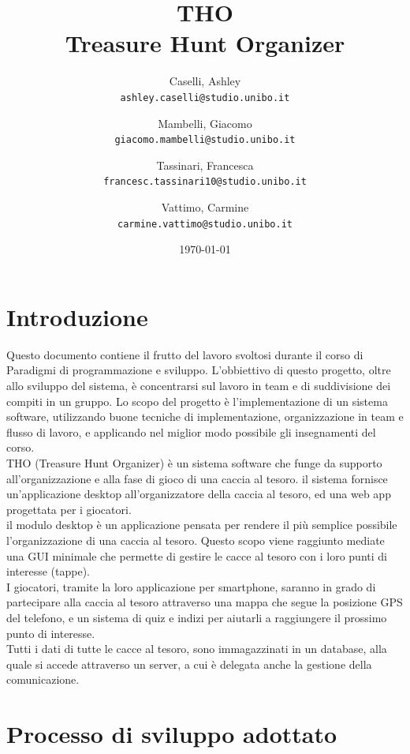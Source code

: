 \documentclass[12pt, italian]{article}
\title{\textbf{THO\\Treasure Hunt Organizer}}
\author{
	Caselli, Ashley\\
	\texttt{ashley.caselli@studio.unibo.it}
	\and
	Mambelli, Giacomo\\
	\texttt{giacomo.mambelli@studio.unibo.it}
	\and
	Tassinari, Francesca\\
	\texttt{francesc.tassinari10@studio.unibo.it}
	\and
	Vattimo, Carmine\\
	\texttt{carmine.vattimo@studio.unibo.it}
}
\date{\today}
\begin{document}
\maketitle
\newpage
\tableofcontents
\newpage

\section{Introduzione}
Questo documento contiene il frutto del lavoro svoltosi durante il corso di Paradigmi di programmazione e sviluppo. L'obbiettivo di questo progetto, oltre allo sviluppo del sistema, è concentrarsi sul lavoro in team e di suddivisione dei compiti in un gruppo. 
Lo scopo del progetto è l'implementazione di un sistema software, utilizzando buone tecniche di implementazione, organizzazione in team e flusso di lavoro, e applicando nel miglior modo possibile gli insegnamenti del corso.\\

THO (Treasure Hunt Organizer) è un sistema software che funge da supporto all'organizzazione e alla fase di gioco di una caccia al tesoro. il sistema fornisce un'applicazione desktop all'organizzatore della caccia al tesoro, ed una web app progettata per i giocatori.\\
il modulo desktop è un applicazione pensata per rendere il più semplice possibile l'organizzazione di una caccia al tesoro. Questo scopo viene raggiunto mediate una GUI minimale che permette di gestire le cacce al tesoro con i loro punti di interesse (tappe).\\

I giocatori, tramite la loro applicazione per smartphone, saranno in grado di partecipare alla caccia al tesoro attraverso una mappa che segue la posizione GPS del telefono, e un sistema di quiz e indizi per aiutarli a raggiungere il prossimo punto di interesse.\\
Tutti i dati di tutte le cacce al tesoro, sono immagazzinati in un database, alla quale si accede attraverso un server, a cui è delegata anche la gestione della comunicazione.

\newpage
\section{Processo di sviluppo adottato}
\end{document}
